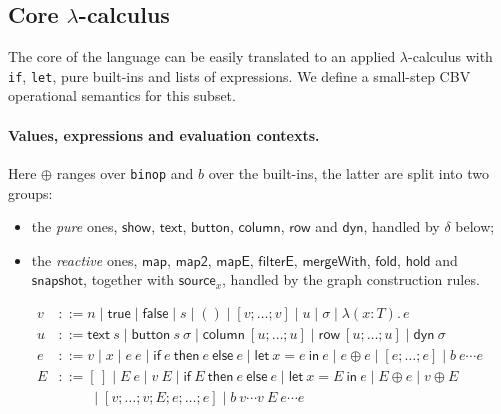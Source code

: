 \documentclass{article}
\newcommand{\kw}[1]{\mathsf{#1}}
\begin{document}
\subsection{Core $ \lambda $-calculus}
The core of the language can be easily translated to an applied $ \lambda $-calculus with \texttt{if}, \texttt{let}, pure built-ins and lists of expressions. We define a small-step CBV operational semantics for this subset.


\paragraph{Values, expressions and evaluation contexts.}
Here $\oplus$ ranges over \texttt{binop} and $b$ over the built-ins, the latter are split into two groups:
\begin{itemize}
  \item the \emph{pure} ones, $\kw{show}$, $\kw{text}$, $\kw{button}$, $\kw{column}$, $\kw{row}$ and $\kw{dyn}$, handled by $\delta$ below;
  \item the \emph{reactive} ones, $\kw{map}$, $\kw{map2}$, $\kw{mapE}$, $\kw{filterE}$, $\kw{mergeWith}$, $\kw{fold}$, $\kw{hold}$ and $\kw{snapshot}$, together with $\kw{source}_x$, handled by the graph construction rules.
\end{itemize}
\begin{align*}
v &::= n \mid \kw{true} \mid \kw{false} \mid s \mid () \mid [v;\dots;v] \mid u \mid \sigma \mid \lambda(x{:}T).\,e\\
u &::= \kw{text}\ s \mid \kw{button}\ s\ \sigma \mid \kw{column}\ [u;\dots;u] \mid \kw{row}\ [u;\dots;u] \mid \kw{dyn}\ \sigma\\
e &::= v \mid x \mid e\ e \mid \kw{if}\ e\ \kw{then}\ e\ \kw{else}\ e \mid \kw{let}\ x = e\ \kw{in}\ e \mid e \oplus e \mid [e;\dots;e] \mid b\ e\cdots e\\
E &::= [\,] \mid E\ e \mid v\ E \mid \kw{if}\ E\ \kw{then}\ e\ \kw{else}\ e \mid \kw{let}\ x = E\ \kw{in}\ e \mid E \oplus e \mid v \oplus E\\
  &\phantom{::=}\ \mid [v;\dots;v;E;e;\dots;e] \mid b\ v\cdots v\ E\ e\cdots e
\end{align*}
\end{document}
